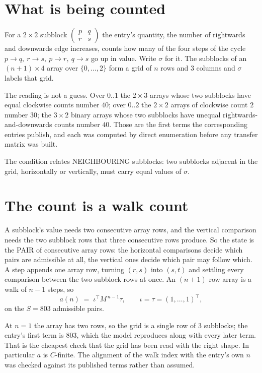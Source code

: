 \documentclass[11pt,a4paper]{article}
\theoremstyle{plain}
\theoremstyle{definition}
\begin{document}
\section{What is being counted}

For a $2\times2$ subblock $\begin{pmatrix}p&q\\r&s\end{pmatrix}$ the
entry's quantity, the number of rightwards and downwards edge increases, counts how many of the four steps of the cycle $p\to q,\ r\to s,\ p\to r,\ q\to s$ go up in value. Write $\sigma$ for it. The subblocks of an
$(n+1)\times4$ array over $\{0,\dots,2\}$ form a grid of $n$ rows and $3$
columns and $\sigma$ labels that grid.

The reading is not a guess. Over $0..1$ the $2\times3$ arrays whose two subblocks have equal
clockwise counts number $40$; over $0..2$ the $2\times2$ arrays of clockwise count $2$ number
$30$; the $3\times2$ binary arrays whose two subblocks have unequal rightwards-and-downwards
counts number $40$. Those are the first terms the corresponding entries publish, and each was
computed by direct enumeration before any transfer matrix was built.

The condition relates NEIGHBOURING subblocks: two subblocks adjacent in the grid, horizontally
or vertically, must carry equal values of $\sigma$.

\section{The count is a walk count}

A subblock's value needs two consecutive array rows, and the vertical
comparison needs the two subblock rows that three consecutive rows produce. So the state is the
PAIR of consecutive array rows: the horizontal comparisons decide which pairs are admissible at
all, the vertical ones decide which pair may follow which. A step appends one array row,
turning $(r,s)$ into $(s,t)$ and settling every comparison between the two subblock rows at
once. An $(n+1)$-row array is a walk of $n-1$ steps, so
\[
a(n)\;=\;\iota^{\!\top}M^{\,n-1}\tau,\qquad\iota=\tau=(1,\dots,1)^{\!\top},
\]
on the $S=803$ admissible pairs.

At $n=1$ the array has two rows, so the grid is a single row of $3$
subblocks; the entry's first term is $803$, which the model
reproduces along with every later term. That is the cheapest check that the grid has been read
with the right shape.
In particular $a$ is $C$-finite. The alignment of the walk index with the entry's own $n$ was
checked against its published terms rather than assumed.
\end{document}
